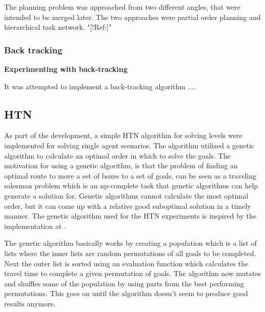 \documentclass[Main]{subfiles}
\begin{document}
\FloatBarrier

The planning problem was approached from two different angles, that were intended to be merged later. The two approaches were partial order planning and hierarchical task network. "[!Ref:]" 


\subsubsection{Back tracking}

\textbf{Experimenting with back-tracking}

It was attempted to implement a back-tracking algorithm ....






\subsection{HTN}
As part of the development, a simple HTN algorithm for solving levels were implemented for solving single agent scenarios.
The algorithm utilized a genetic algorithm to calculate an optimal order in which to solve the goals.
The motivation for using a genetic algorithm, is that the problem of finding an optimal route to move a set of boxes to a set of goals, can be seen as a traveling salesman problem which is an np-complete task that genetic algorithms can help generate a solution for.
Genetic algorithms cannot calculate the most optimal order, but it can come up with a relative good suboptimal solution in a timely manner. The genetic algorithm used for the HTN experiments is inspired by the implementation at \cite{genetic}.

The genetic algorithm basically works by creating a population which is a list of lists where the inner lists are random permutations of all goals to be completed.
Next the outer list is sorted using an evaluation function which calculates the travel time to complete a given permutation of goals.
The algorithm now mutates and shuffles some of the population by using parts from the best performing permutations.
This goes on until the algorithm doesn't seem to produce good results anymore.
\end{document}

